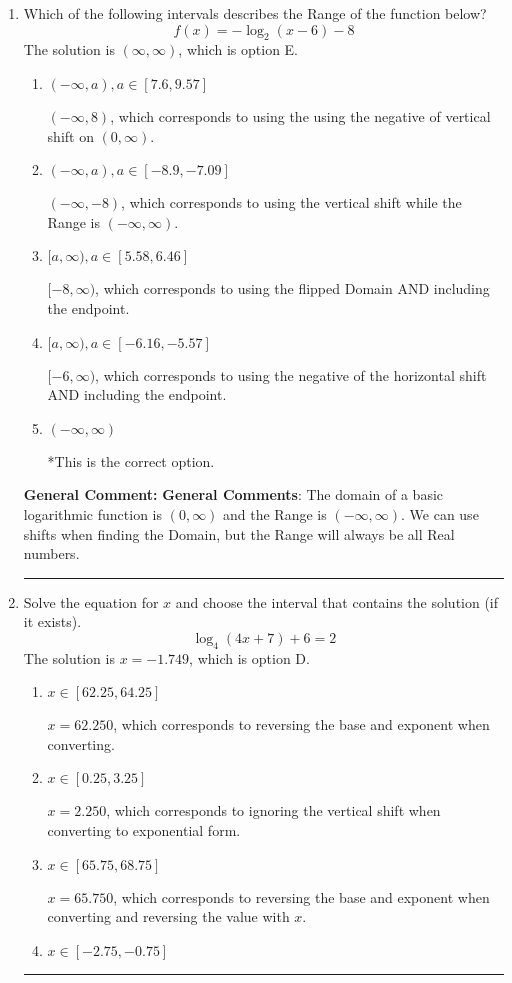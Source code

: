 \documentclass{extbook}[14pt]
\newcommand{\litem}[1]{\item #1

\rule{\textwidth}{0.4pt}}
\begin{document}
\begin{enumerate}\litem{
Which of the following intervals describes the Range of the function below?
\[ f(x) = -\log_2{(x-6)}-8 \]The solution is \( (\infty, \infty) \), which is option E.\begin{enumerate}[label=\Alph*.]
\item \( (-\infty, a), a \in [7.6, 9.57] \)

$(-\infty, 8)$, which corresponds to using the using the negative of vertical shift on $(0, \infty)$.
\item \( (-\infty, a), a \in [-8.9, -7.09] \)

$(-\infty, -8)$, which corresponds to using the vertical shift while the Range is $(-\infty, \infty)$.
\item \( [a, \infty), a \in [5.58, 6.46] \)

$[-8, \infty)$, which corresponds to using the flipped Domain AND including the endpoint.
\item \( [a, \infty), a \in [-6.16, -5.57] \)

$[-6, \infty)$, which corresponds to using the negative of the horizontal shift AND including the endpoint.
\item \( (-\infty, \infty) \)

*This is the correct option.
\end{enumerate}

\textbf{General Comment:} \textbf{General Comments}: The domain of a basic logarithmic function is $(0, \infty)$ and the Range is $(-\infty, \infty)$. We can use shifts when finding the Domain, but the Range will always be all Real numbers.
}
\litem{
Solve the equation for $x$ and choose the interval that contains the solution (if it exists).
\[ \log_{4}{(4x+7)}+6 = 2 \]The solution is \( x = -1.749 \), which is option D.\begin{enumerate}[label=\Alph*.]
\item \( x \in [62.25, 64.25] \)

$x = 62.250$, which corresponds to reversing the base and exponent when converting.
\item \( x \in [0.25, 3.25] \)

$x = 2.250$, which corresponds to ignoring the vertical shift when converting to exponential form.
\item \( x \in [65.75, 68.75] \)

$x = 65.750$, which corresponds to reversing the base and exponent when converting and reversing the value with $x$.
\item \( x \in [-2.75, -0.75] \)


\end{enumerate}}
\end{enumerate}
\end{document}
